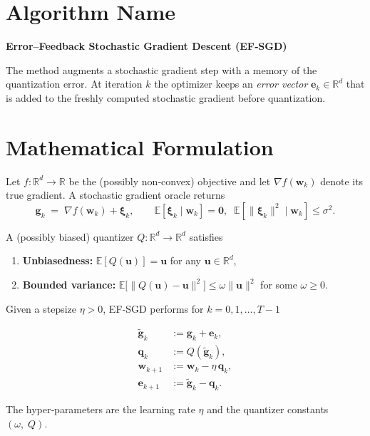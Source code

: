 \documentclass{article}
\newcommand{\E}{\mathbb{E}}
\newcommand{\R}{\mathbb{R}}
\begin{document}
\section*{Algorithm Name}
\textbf{Error–Feedback Stochastic Gradient Descent (EF‑SGD)}  

The method augments a stochastic gradient step with a memory of the quantization error.  
At iteration $k$ the optimizer keeps an \emph{error vector} $\bm e_k\in\R^d$ that is added to the freshly computed stochastic gradient before quantization.  

\section*{Mathematical Formulation}
Let $f:\R^d\to\R$ be the (possibly non‑convex) objective and let $\nabla f(\bm w_k)$ denote its true gradient.  
A stochastic gradient oracle returns
\[
\bm g_k \;=\; \nabla f(\bm w_k)+\bm\xi_k ,\qquad 
\E[\bm\xi_k\mid\bm w_k]=\bm 0,\;\;
\E[\|\bm\xi_k\|^2\mid\bm w_k]\le\sigma^2 .
\]

A (possibly biased) quantizer $Q:\R^d\to\R^d$ satisfies  

\begin{enumerate}[label=(\roman*)]
\item \textbf{Unbiasedness:} $\E[Q(\bm u)]=\bm u$ for any $\bm u\in\R^d$,
\item \textbf{Bounded variance:} $\E\!\big[\|Q(\bm u)-\bm u\|^2\big]\le \omega \|\bm u\|^2$ for some $\omega\ge0$.
\end{enumerate}

Given a stepsize $\eta>0$, EF‑SGD performs for $k=0,1,\dots,T-1$  

\[
\boxed{
\begin{aligned}
\tilde{\bm g}_k &:= \bm g_k + \bm e_k,\\[2mm]
\bm q_k        &:= Q(\tilde{\bm g}_k),\\[2mm]
\bm w_{k+1}    &:= \bm w_k - \eta\,\bm q_k,\\[2mm]
\bm e_{k+1}    &:= \tilde{\bm g}_k - \bm q_k .
\end{aligned}}
\tag{EF‑SGD}
\]

The hyper‑parameters are the learning rate $\eta$ and the quantizer constants $(\omega,\;Q)$.  
\end{document}
